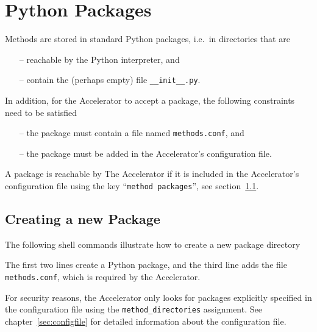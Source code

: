 \section{Python Packages}
Methods are stored in standard Python packages, i.e.\ in directories
that are
\begin{itemize}
\item[--] reachable by the Python interpreter, and
\item[--] contain the (perhaps empty) file \texttt{\_\_init\_\_.py}.
\end{itemize}
In addition, for the Accelerator to accept a package, the following
constraints need to be satisfied
\begin{itemize}
\item[--] the package must contain a file named \texttt{methods.conf}, and
\item[--] the package must be added in the Accelerator's configuration file.
\end{itemize}
A package is reachable by The Accelerator if it is included in the
Accelerator's configuration file using the key
``\texttt{method packages}'', see section~\ref{}.


\subsection{Creating a new Package}
The following shell commands illustrate how to create a new package
directory
\begin{shell}
\end{shell}
The first two lines create a Python package, and the third line adds
the file \texttt{methods.conf}, which is required by the Accelerator.

For security reasons, the Accelerator only looks for packages
explicitly specified in the configuration file using the
\texttt{method_directories} assignment.  See
chapter~\ref{sec:configfile} for detailed information about the
configuration file.



